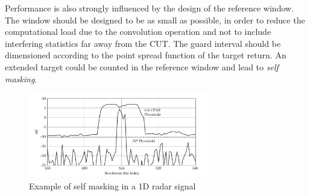 Performance is also strongly influenced by the design of the reference window. The window should be designed to be as small as possible, in order to reduce the computational load due to the convolution operation and not to include interfering statistics far away from the CUT. The guard interval should be dimensioned according to the point spread function of the target return. An extended target could be counted in the reference window and lead to \textit{self masking}.

	\begin{figure}[H]
		\centering
		\includegraphics[width=0.7\textwidth]{Images/radar_detect_threshold/self_masking_Richards2010.png}
		\caption{Example of self masking in a 1D radar signal \cite{Richards_Scheer_Holm_2010}}
		\label{fig:self_masking_Richards2010}
	\end{figure}

